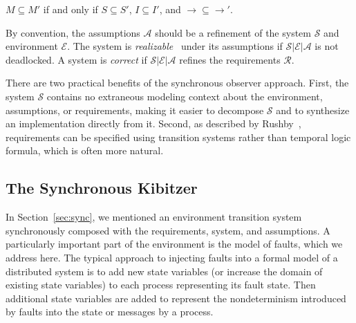 \documentclass{llncs/llncs}
\newcommand{\lee}[1]{ } %
\newcommand{\lee}[1]{ {\color{blue}$<$lee: #1$>$} } %
\begin{document}
\begin{definition}
$M \subseteq M'$ if and only if $S \subseteq S'$, $I \subseteq I'$, and $\rightarrow \subseteq \rightarrow'$.
\end{definition}

By convention, the assumptions $\mathcal{A}$ should be a refinement of the system $\mathcal{S}$ and environment $\mathcal{E}$. The system is \emph{realizable}~\cite{} under its assumptions if $\mathcal{S} | \mathcal{E} | \mathcal{A}$ is not deadlocked. A system is \emph{correct} if $\mathcal{S} | \mathcal{E} | \mathcal{A}$ refines the requirements $\mathcal{R}$.

There are two practical benefits of the synchronous observer approach. First, the system $\mathcal{S}$ contains no extraneous modeling context about the environment, assumptions, or requirements, making it easier to decompose $\mathcal{S}$ and to synthesize an implementation directly from it. Second, as described by Rushby~\cite{}, requirements can be specified using transition systems rather than temporal logic formula, which is often more natural.

\subsection{The Synchronous Kibitzer}\label{sec:kibitzer}
\lee{We use synchronous composition to implement fault injection. Mention in the intro. This is fundamental to the model, so we have section devoted to it.}
In Section~\ref{sec:sync}, we mentioned an environment transition system synchronously composed with the requirements, system, and assumptions. A particularly important part of the environment is the model of faults, which we address here. The typical approach to injecting faults into a formal model of a distributed system is to add new state variables (or increase the domain of existing state variables) to each process representing its fault state. Then additional state variables are added to represent the nondeterminism introduced by faults into the state or messages by a process.

\end{document}
